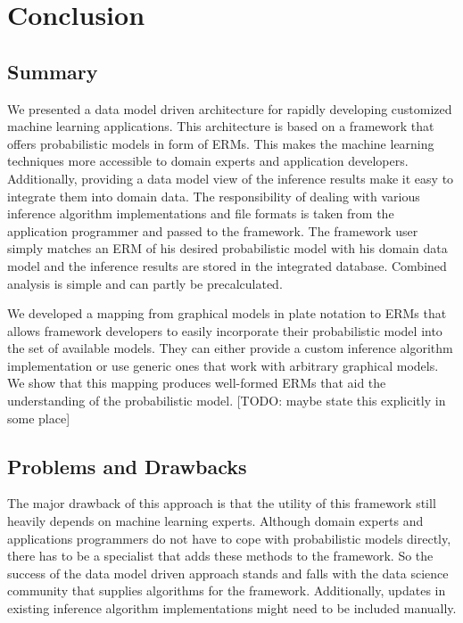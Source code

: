 \section{Conclusion}

\subsection{Summary}

We presented a data model driven architecture for rapidly developing customized machine learning applications. This architecture is based on a framework that offers probabilistic models in form of ERMs. This makes the machine learning techniques more accessible to domain experts and application developers. Additionally, providing a data model view of the inference results make it easy to integrate them into domain data. The responsibility of dealing with various inference algorithm implementations and file formats is taken from the application programmer and passed to the framework. The framework user simply matches an ERM of his desired probabilistic model with his domain data model and the inference results are stored in the integrated database. Combined analysis is simple and can partly be precalculated.

We developed a mapping from graphical models in plate notation to ERMs that allows framework developers to easily incorporate their probabilistic model into the set of available models. They can either provide a custom inference algorithm implementation or use generic ones that work with arbitrary graphical models. We show that this mapping produces well-formed ERMs that aid the understanding of the probabilistic model. [TODO: maybe state this explicitly in some place]

\subsection{Problems and Drawbacks}

The major drawback of this approach is that the utility of this framework still heavily depends on machine learning experts. Although domain experts and applications programmers do not have to cope with probabilistic models directly, there has to be a specialist that adds these methods to the framework. So the success of the data model driven approach stands and falls with the data science community that supplies algorithms for the framework. Additionally, updates in existing inference algorithm implementations might need to be included manually.

